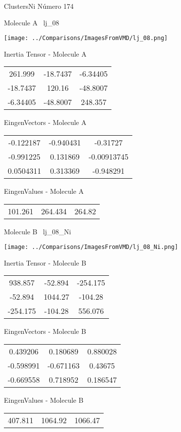 \vtab[-3cm]
\begin{center}
{\large ClustersNi \tab Número 174}
\end{center}
\begin{multicols}{2}
\begin{center}

Molecule A \
lj\_08

\texttt{[image: ../Comparisons/ImagesFromVMD/lj\_08.png]}

Inertia Tensor - Molecule A \\
\begin{tabular}{|c c c|}
261.999	 & 	-18.7437	 & 	-6.34405	 \\
-18.7437	 & 	120.16	 & 	-48.8007	 \\
-6.34405	 & 	-48.8007	 & 	248.357
\end{tabular}

\vtab
 EingenVectors - Molecule A     \\
\begin{tabular}{|c c c|}
-0.122187	 & 	-0.940431	 & 	-0.31727	 \\
-0.991225	 & 	0.131869	 & 	-0.00913745	 \\
0.0504311	 & 	0.313369	 & 	-0.948291
\end{tabular}

\vtab
 EingenValues - Molecule A     \\
\begin{tabular}{|c c c|}
101.261	 & 	264.434	 & 	264.82	 \\
\end{tabular}
\columnbreak

Molecule B \
lj\_08\_Ni

\texttt{[image: ../Comparisons/ImagesFromVMD/lj\_08\_Ni.png]}

Inertia Tensor - Molecule B \\
\begin{tabular}{|c c c|}
938.857	 & 	-52.894	 & 	-254.175	 \\
-52.894	 & 	1044.27	 & 	-104.28	 \\
-254.175	 & 	-104.28	 & 	556.076
\end{tabular}

\vtab
 EingenVectors - Molecule B     \\
\begin{tabular}{|c c c|}
0.439206	 & 	0.180689	 & 	0.880028	 \\
-0.598991	 & 	-0.671163	 & 	0.43675	 \\
-0.669558	 & 	0.718952	 & 	0.186547
\end{tabular}

\vtab
 EingenValues - Molecule B     \\
\begin{tabular}{|c c c|}
407.811	 & 	1064.92	 & 	1066.47	 \\
\end{tabular}

\end{center}
\end{multicols}

